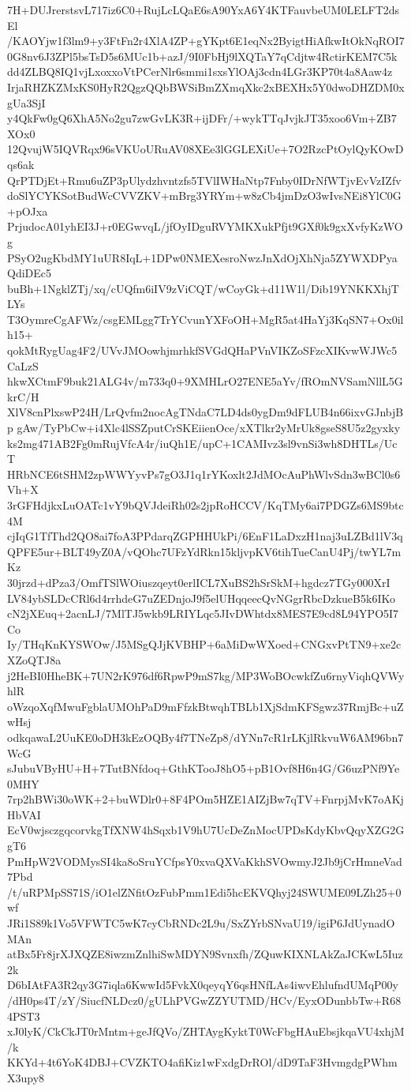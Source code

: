 7H+DUJrerstsvL717iz6C0+RujLcLQaE6sA90YxA6Y4KTFauvbeUM0LELFT2dsEl
/KAOYjw1f3lm9+y3FtFn2r4XlA4ZP+gYKpt6E1eqNx2ByigtHiAfkwItOkNqROI7
0G8nv6J3ZPl5bsTsD5s6MUc1b+azJ/9I0FbHj9lXQTaY7qCdjtw4RctirKEM7C5k
dd4ZLBQ8IQ1vjLxoxxoVtPCerNlr6smmi1sxsYlOAj3cdn4LGr3KP70t4a8Aaw4z
IrjaRHZKZMxKS0HyR2QgzQQbBWSiBmZXmqXkc2xBEXHx5Y0dwoDHZDM0xgUa3SjI
y4QkFw0gQ6XhA5No2gu7zwGvLK3R+ijDFr/+wykTTqJvjkJT35xoo6Vm+ZB7XOx0
12QvujW5IQVRqx96sVKUoURuAV08XEe3lGGLEXiUe+7O2RzcPtOylQyKOwDqs6ak
QrPTDjEt+Rmu6uZP3pUlydzhvntzfs5TVlIWHaNtp7Fnby0IDrNfWTjvEvVzIZfv
doSlYCYKSotBudWcCVVZKV+mBrg3YRYm+w8zCb4jmDzO3wIvsNEi8YlC0G+pOJxa
PrjudocA01yhEI3J+r0EGwvqL/jfOyIDguRVYMKXukPfjt9GXf0k9gxXvfyKzWOg
PSyO2ugKbdMY1uUR8IqL+1DPw0NMEXesroNwzJnXdOjXhNja5ZYWXDPyaQdiDEc5
buBh+1NgklZTj/xq/cUQfm6iIV9zViCQT/wCoyGk+d11W1l/Dib19YNKKXhjTLYs
T3OymreCgAFWz/csgEMLgg7TrYCvunYXFoOH+MgR5at4HaYj3KqSN7+Ox0ilh15+
qokMtRygUag4F2/UVvJMOowhjmrhkfSVGdQHaPVnVIKZoSFzcXIKvwWJWc5CaLzS
hkwXCtmF9buk21ALG4v/m733q0+9XMHLrO27ENE5aYv/fROmNVSamNllL5GkrC/H
XlV8cnPlxswP24H/LrQvfm2nocAgTNdaC7LD4ds0ygDm9dFLUB4n66ixvGJnbjBp
gAw/TyPbCw+i4Xlc4lSSZputCrSKEiienOce/xXTlkr2yMrUk8gseS8U5z2gyxky
ks2mg471AB2Fg0mRujVfcA4r/iuQh1E/upC+1CAMIvz3sl9vnSi3wh8DHTLs/UcT
HRbNCE6tSHM2zpWWYyvPs7gO3J1q1rYKoxlt2JdMOcAuPhWlvSdn3wBCl0s6Vh+X
3rGFHdjkxLuOATc1vY9bQVJdeiRh02s2jpRoHCCV/KqTMy6ai7PDGZs6MS9btc4M
cjIqG1TfThd2QO8ai7foA3PPdarqZGPHHUkPi/6EnF1LaDxzH1naj3uLZBd1lV3q
QPFE5ur+BLT49yZ0A/vQOhc7UFzYdRkn15kljvpKV6tihTueCanU4Pj/twYL7mKz
30jrzd+dPza3/OmfTSlWOiuszqeyt0erlICL7XuBS2hSrSkM+hgdcz7TGy000XrI
LV84ybSLDcCRl6d4rrhdeG7uZEDnjoJ9f5elUHqqeecQvNGgrRbcDzkueB5k6IKo
cN2jXEuq+2acnLJ/7MlTJ5wkb9LRIYLqc5JIvDWhtdx8MES7E9cd8L94YPO5I7Co
Iy/THqKnKYSWOw/J5MSgQJjKVBHP+6aMiDwWXoed+CNGxvPtTN9+xe2cXZoQTJ8a
j2HeBI0HheBK+7UN2rK976df6RpwP9mS7kg/MP3WoBOcwkfZu6rnyViqhQVWyhlR
oWzqoXqfMwuFgblaUMOhPaD9mFfzkBtwqhTBLb1XjSdmKFSgwz37RmjBc+uZwHsj
odkqawaL2UuKE0oDH3kEzOQBy4f7TNeZp8/dYNn7cR1rLKjlRkvuW6AM96bn7WcG
sJubuVByHU+H+7TutBNfdoq+GthKTooJ8hO5+pB1Ovf8H6n4G/G6uzPNf9Ye0MHY
7rp2hBWi30oWK+2+buWDlr0+8F4POm5HZE1AIZjBw7qTV+FnrpjMvK7oAKjHbVAI
EcV0wjsczgqcorvkgTfXNW4hSqxb1V9hU7UcDeZnMocUPDsKdyKbvQqyXZG2GgT6
PmHpW2VODMysSI4ka8oSruYCfpsY0xvaQXVaKkhSVOwmyJ2Jb9jCrHmneVad7Pbd
/t/uRPMpSS71S/iO1elZNfitOzFubPmm1Edi5hcEKVQhyj24SWUME09LZh25+0wf
JRi1S89k1Vo5VFWTC5wK7cyCbRNDc2L9u/SxZYrbSNvaU19/igiP6JdUynadOMAn
atBx5Fr8jrXJXQZE8iwzmZnlhiSwMDYN9Svnxfh/ZQuwKIXNLAkZaJCKwL5Iuz2k
D6bIAtFA3R2qy3G7iqla6KwwId5FvkX0qeyqY6qsHNfLAs4iwvEhlufndUMqP00y
/dH0ps4T/zY/SiucfNLDcz0/gULhPVGwZZYUTMD/HCv/EyxODunbbTw+R684PST3
xJ0lyK/CkCkJT0rMntm+geJfQVo/ZHTAygKyktT0WcFbgHAuEbsjkqaVU4xhjM/k
KKYd+4t6YoK4DBJ+CVZKTO4afiKiz1wFxdgDrROl/dD9TaF3HvmgdgPWhmX3upy8
